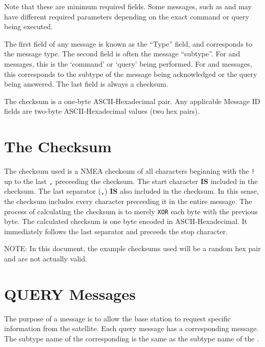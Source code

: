 \documentclass{article}
\begin{document}
Note that these are minimum required fields. Some messages, such as \mquery and \mcommand may have
different required parameters depending on the exact command or query being executed.

The first field of any message is known as the ``Type'' field, and corresponds to the message type.
The second field is often the message ``subtype''. For \mquery and \mcommand messages, this is the `command' or `query'
being performed. For \mresult and \macommand messages, this corresponds to the subtype of the message
being acknowledged or the query being answered. The last field is always a checksum.


  The checksum is a one-byte ASCII-Hexadecimal pair. Any applicable Message ID fields are two-byte ASCII-Hexadecimal values (two hex pairs).
  
\section{The Checksum}
  The checksum used is a NMEA checksum of all characters beginning with the \texttt{!} up to the last \texttt{,} preceeding the checksum.
  The start character \textbf{IS} included in the checksum. The last separator (\texttt{,}) \textbf{IS} also included in the checksum. In
  this sense, the checksum includes every character preceeding it in the entire message.
  The process of calculating the checksum is to merely \texttt{XOR} each byte with the previous byte.
  The calculated checksum is one byte encoded in ASCII-Hexadecimal. It immediately follows the last separator and preceeds the stop character.
  
  
  \large NOTE: \normalsize In this document, the example checksums used will be a random hex pair and are not actually valid.
  
\pagebreak
\section{QUERY Messages}
  The purpose of a \mquery message is to allow the base station to request specific information from the satellite.
  Each query message has a corresponding \mresult message. The subtype name of the corresponding \mresult
  is the same as the subtype name of the \mquery.
  
\end{document}
